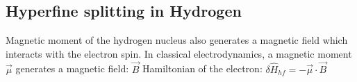 \subsection{Hyperfine splitting in Hydrogen}
Magnetic moment of the hydrogen nucleus also generates a magnetic field which
interacts with the electron spin. In classical electrodynamics, a magnetic moment
$\vec{\mu}$ generates a magnetic field: $\vec{B}$
Hamiltonian of the electron: $\delta \hat{H}_{hf} = - \vec{\mu} \cdot \vec{B}$


